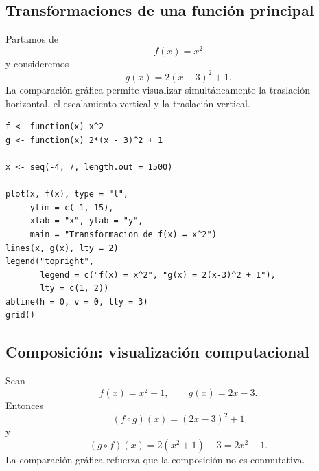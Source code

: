 \documentclass[12pt]{article}
\theoremstyle{remark}
\begin{document}
\subsection*{Transformaciones de una función principal}

Partamos de
\[
f(x)=x^2
\]
y consideremos
\[
g(x)=2(x-3)^2+1.
\]
La comparación gráfica permite visualizar simultáneamente la traslación
horizontal, el escalamiento vertical y la traslación vertical.

\begin{center}
\end{center}

\begin{verbatim}
f <- function(x) x^2
g <- function(x) 2*(x - 3)^2 + 1

x <- seq(-4, 7, length.out = 1500)

plot(x, f(x), type = "l",
     ylim = c(-1, 15),
     xlab = "x", ylab = "y",
     main = "Transformacion de f(x) = x^2")
lines(x, g(x), lty = 2)
legend("topright",
       legend = c("f(x) = x^2", "g(x) = 2(x-3)^2 + 1"),
       lty = c(1, 2))
abline(h = 0, v = 0, lty = 3)
grid()
\end{verbatim}

\subsection*{Composición: visualización computacional}

Sean
\[
f(x)=x^2+1,\qquad g(x)=2x-3.
\]
Entonces
\[
(f\circ g)(x)=(2x-3)^2+1
\]
y
\[
(g\circ f)(x)=2(x^2+1)-3=2x^2-1.
\]
La comparación gráfica refuerza que la composición no es conmutativa.

\begin{center}
\end{center}
\end{document}
